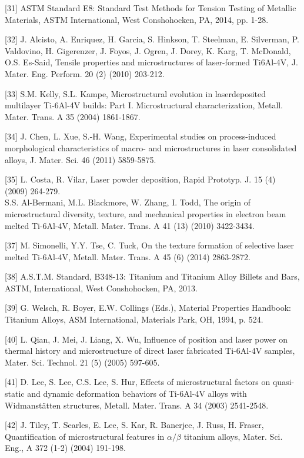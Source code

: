 \documentclass[10pt]{article}
\begin{document}
[31] ASTM Standard E8: Standard Test Methods for Tension Testing of Metallic Materials, ASTM International, West Conshohocken, PA, 2014, pp. 1-28.

[32] J. Alcisto, A. Enriquez, H. Garcia, S. Hinkson, T. Steelman, E. Silverman, P. Valdovino, H. Gigerenzer, J. Foyos, J. Ogren, J. Dorey, K. Karg, T. McDonald, O.S. Es-Said, Tensile properties and microstructures of laser-formed Ti6Al-4V, J. Mater. Eng. Perform. 20 (2) (2010) 203-212.

[33] S.M. Kelly, S.L. Kampe, Microstructural evolution in laserdeposited multilayer Ti-6Al-4V builds: Part I. Microstructural characterization, Metall. Mater. Trans. A 35 (2004) 1861-1867.

[34] J. Chen, L. Xue, S.-H. Wang, Experimental studies on process-induced morphological characteristics of macro- and microstructures in laser consolidated alloys, J. Mater. Sci. 46 (2011) 5859-5875.

[35] L. Costa, R. Vilar, Laser powder deposition, Rapid Prototyp. J. 15 (4) (2009) 264-279.\\
[36] S.S. Al-Bermani, M.L. Blackmore, W. Zhang, I. Todd, The origin of microstructural diversity, texture, and mechanical properties in electron beam melted Ti-6Al-4V, Metall. Mater. Trans. A 41 (13) (2010) 3422-3434.

[37] M. Simonelli, Y.Y. Tse, C. Tuck, On the texture formation of selective laser melted Ti-6Al-4V, Metall. Mater. Trans. A 45 (6) (2014) 2863-2872.

[38] A.S.T.M. Standard, B348-13: Titanium and Titanium Alloy Billets and Bars, ASTM, International, West Conshohocken, PA, 2013.

[39] G. Welsch, R. Boyer, E.W. Collings (Eds.), Material Properties Handbook: Titanium Alloys, ASM International, Materials Park, OH, 1994, p. 524.

[40] L. Qian, J. Mei, J. Liang, X. Wu, Influence of position and laser power on thermal history and microstructure of direct laser fabricated Ti-6Al-4V samples, Mater. Sci. Technol. 21 (5) (2005) 597-605.

[41] D. Lee, S. Lee, C.S. Lee, S. Hur, Effects of microstructural factors on quasi-static and dynamic deformation behaviors of Ti-6Al-4V alloys with Widmanstätten structures, Metall. Mater. Trans. A 34 (2003) 2541-2548.

[42] J. Tiley, T. Searles, E. Lee, S. Kar, R. Banerjee, J. Russ, H. Fraser, Quantification of microstructural features in $\alpha / \beta$ titanium alloys, Mater. Sci. Eng., A 372 (1-2) (2004) 191-198.
\end{document}
